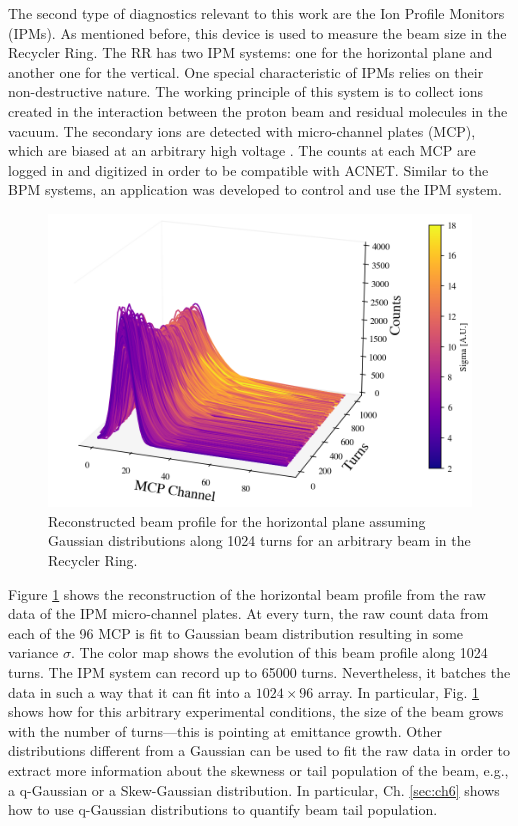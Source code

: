 The second type of diagnostics relevant to this work are the Ion Profile Monitors (IPMs). As mentioned before, this device is used to measure the beam size in the Recycler Ring. The RR has two IPM systems: one for the horizontal plane and another one for the vertical. One special characteristic of IPMs relies on their non-destructive nature. The working principle of this system is to collect ions created in the interaction between the proton beam and residual molecules in the vacuum. The secondary ions are detected with micro-channel plates (MCP), which are biased at an arbitrary high voltage \cite{betiay}. The counts at each MCP are logged in and digitized in order to be compatible with ACNET. Similar to the BPM systems, an application was developed to control and use the IPM system.     

\begin{figure}[H]
   \centering
   \includegraphics[width=\columnwidth]{chapter3/ipm.png}
   \caption{Reconstructed beam profile for the horizontal plane assuming Gaussian distributions along 1024 turns for an arbitrary beam in the Recycler Ring.}
   \label{fig:ipm0}
\end{figure}

Figure \ref{fig:ipm0} shows the reconstruction of the horizontal beam profile from the raw data of the IPM micro-channel plates. At every turn, the raw count data from each of the 96 MCP is fit to Gaussian beam distribution resulting in some variance $\sigma$. The color map shows the evolution of this beam profile along 1024 turns. The IPM system can record up to 65000 turns. Nevertheless, it batches the data in such a way that it can fit into a $1024 \times 96$ array. In particular, Fig. \ref{fig:ipm0} shows how for this arbitrary experimental conditions, the size of the beam grows with the number of turns---this is pointing at emittance growth. Other distributions different from a Gaussian can be used to fit the raw data in order to extract more information about the skewness or tail population of the beam, e.g., a q-Gaussian or a Skew-Gaussian distribution. In particular, Ch. \ref{sec:ch6} shows how to use q-Gaussian distributions to quantify beam tail population.

